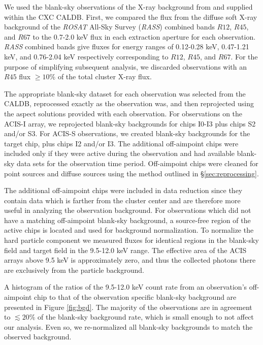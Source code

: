 \documentclass[apj]{emulateapj}
\begin{document}
We used the blank-sky observations of the X-ray background from
\cite{2001ApJ...562L.153M} and supplied within the CXC
{\textsc{CALDB}}. First, we compared the flux from the diffuse soft
X-ray background of the {\it{ROSAT}} All-Sky Survey ({\it RASS})
combined bands $R12$, $R45$, and $R67$ to the 0.7-2.0 keV flux in each
extraction aperture for each observation. {\it RASS} combined bands
give fluxes for energy ranges of 0.12-0.28 keV, 0.47-1.21 keV, and
0.76-2.04 keV respectively corresponding to $R12$, $R45$, and $R67$. For
the purpose of simplifying subsequent analysis, we discarded
observations with an $R45$ flux $\geq 10\%$ of the total cluster X-ray
flux.

The appropriate blank-sky dataset for each observation was
selected from the {\textsc{CALDB}}, reprocessed exactly as the
observation was, and then reprojected using the aspect solutions provided
with each observation. For observations on the ACIS-I array, we
reprojected blank-sky backgrounds for chips I0-I3 plus chips S2 and/or
S3. For ACIS-S observations, we created blank-sky backgrounds for
the target chip, plus chips I2 and/or I3. The additional off-aimpoint
chips were included only if they were active during the observation
and had available blank-sky data sets for the observation time
period. Off-aimpoint chips were cleaned for point sources and diffuse
sources using the method outlined in \S\ref{sec:reprocessing}.

The additional off-aimpoint chips were included in data reduction
since they contain data which is farther from the cluster center and
are therefore more useful in analyzing the observation background. For
observations which did not have a matching off-aimpoint blank-sky
background, a source-free region of the active chips is
located and used for background normalization. To normalize the hard
particle component we measured fluxes for identical regions in the
blank-sky field and target field in the 9.5-12.0 keV range. The
effective area of the ACIS arrays above 9.5 keV is approximately zero,
and thus the collected photons there are exclusively from the particle
background.

A histogram of the ratios of the 9.5-12.0 keV count rate from an
observation's off-aimpoint chip to that of the observation specific
blank-sky background are presented in Figure \ref{fig:bgd}. The
majority of the observations are in agreement to $\lesssim 20\%$ of
the blank-sky background rate, which is small enough to not affect our
analysis. Even so, we re-normalized all blank-sky backgrounds to match
the observed background.
\end{document}
